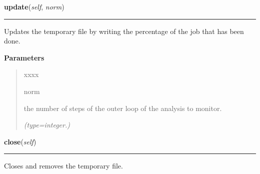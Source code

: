     \label{nMOLDYN:Core:IOFiles:TemporaryFile:update}

    \vspace{0.5ex}

\hspace{.8\funcindent}\begin{boxedminipage}{\funcwidth}

    \raggedright \textbf{update}(\textit{self}, \textit{norm})

    \vspace{-1.5ex}

    \rule{\textwidth}{0.5\fboxrule}
\setlength{\parskip}{2ex}
    Updates the temporary file by writing the percentage of the job that 
    has been done.

\setlength{\parskip}{1ex}
      \textbf{Parameters}
      \vspace{-1ex}

      \begin{quote}
        \begin{Ventry}{xxxx}

          \item[norm]

          the number of steps of the outer loop of the analysis to monitor.

            {\it (type=integer.)}

        \end{Ventry}

      \end{quote}

    \end{boxedminipage}

    \label{nMOLDYN:Core:IOFiles:TemporaryFile:close}

    \vspace{0.5ex}

\hspace{.8\funcindent}\begin{boxedminipage}{\funcwidth}

    \raggedright \textbf{close}(\textit{self})

    \vspace{-1.5ex}

    \rule{\textwidth}{0.5\fboxrule}
\setlength{\parskip}{2ex}
    Closes and removes the temporary file.

\setlength{\parskip}{1ex}
    \end{boxedminipage}

